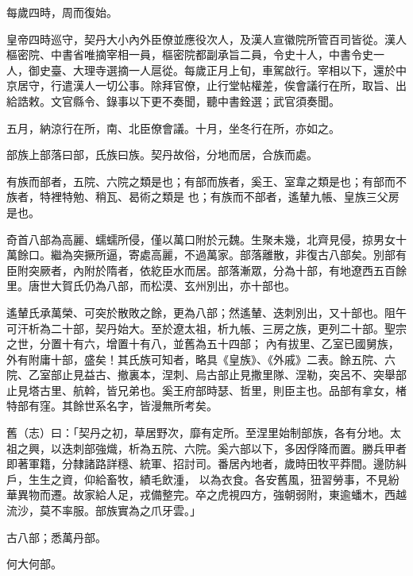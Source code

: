 \begin{pinyinscope}
 每歲四時，周而復始。



 皇帝四時巡守，契丹大小內外臣僚並應役次人，及漢人宣徽院所管百司皆從。漢人樞密院、中書省唯摘宰相一員，樞密院都副承旨二員，令史十人，中書令史一
 人，御史臺、大理寺選摘一人扈從。每歲正月上旬，車駕啟行。宰相以下，還於中京居守，行遣漢人一切公事。除拜官僚，止行堂帖權差，俟會議行在所，取旨、出給誥敕。文官縣令、錄事以下更不奏聞，聽中書銓選；武官須奏聞。



 五月，納涼行在所，南、北臣僚會議。十月，坐冬行在所，亦如之。



 部族上部落曰部，氏族曰族。契丹故俗，分地而居，合族而處。



 有族而部者，五院、六院之類是也；有部而族者，奚王、室韋之類是也；有部而不族者，特裡特勉、稍瓦、曷術之類是
 也；有族而不部者，遙輦九帳、皇族三父房是也。



 奇首八部為高麗、蠕蠕所侵，僅以萬口附於元魏。生聚未幾，北齊見侵，掠男女十萬餘口。繼為突撅所逼，寄處高麗，不過萬家。部落離散，非復古八部矣。別部有臣附突厥者，內附於隋者，依紇臣水而居。部落漸眾，分為十部，有地遼西五百餘里。唐世大賀氏仍為八部，而松漠、玄州別出，亦十部也。



 遙輦氏承萬榮、可突於散敗之餘，更為八部；然遙輦、迭刺別出，又十部也。阻午可汗析為二十部，契丹始大。至於遼太祖，析九帳、三房之族，更列二十部。聖宗之世，分置十有六，增置十有八，並舊為五十四部；
 內有拔里、乙室已國舅族，外有附庸十部，盛矣！其氏族可知者，略具《皇族》、《外戚》二表。餘五院、六院、乙室部止見益古、撤裏本，涅刺、烏古部止見撒里隊、涅勒，突呂不、突舉部止見塔古里、航斡，皆兄弟也。奚王府部時瑟、哲里，則臣主也。品部有拿女，楮特部有窪。其餘世系名字，皆漫無所考矣。



 舊（志）曰：「契丹之初，草居野次，靡有定所。至涅里始制部族，各有分地。太祖之興，以迭刺部強熾，析為五院、六院。奚六部以下，多因俘降而置。勝兵甲者即著軍籍，分隸諸路詳穩、統軍、招討司。番居內地者，歲時田牧平莽間。邊防糾戶，生生之資，仰給畜牧，績毛飲湩，
 以為衣食。各安舊風，狃習勞事，不見紛華異物而遷。故家給人足，戎備整完。卒之虎視四方，強朝弱附，東逾蟠木，西越流沙，莫不率服。部族實為之爪牙雲。」



 古八部；悉萬丹部。



 何大何部。




\end{pinyinscope}
